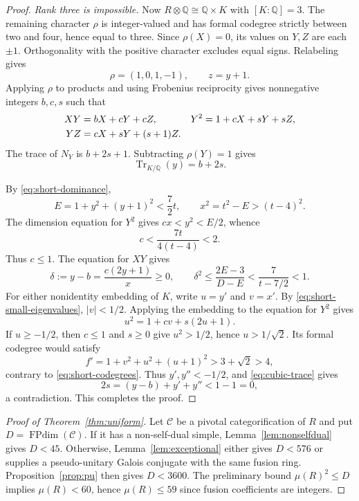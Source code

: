 \documentclass[11pt]{amsart}
\theoremstyle{definition}
\DeclareMathOperator{\FPdim}{FPdim}
\DeclareMathOperator{\Tr}{Tr}
\newcommand{\Q}{\mathbb Q}
\numberwithin{equation}{section}
\begin{document}
\begin{proof}
\smallskip\noindent
\emph{Rank three is impossible.}
Now $R\otimes\Q\cong\Q\times K$ with $[K:\Q]=3$. The remaining character $\rho$ is integer-valued and has formal codegree strictly between two and four, hence equal to three. Since $\rho(X)=0$, its values on $Y,Z$ are each $\pm1$. Orthogonality with the positive character excludes equal signs. Relabeling gives
\begin{equation}\label{eq:cubic-rational}
 \rho=(1,0,1,-1),\qquad z=y+1.
\end{equation}
Applying $\rho$ to products and using Frobenius reciprocity gives
nonnegative integers $b,c,s$ such that
\begin{align}
 XY&=bX+cY+cZ, &Y^2&=1+cX+sY+sZ,\label{eq:cubic-products}\\
 YZ&=cX+sY+(s+1)Z.\notag
\end{align}
The trace of $N_Y$ is $b+2s+1$. Subtracting $\rho(Y)=1$ gives
\begin{equation}\label{eq:cubic-trace}
 \Tr_{K/\Q}(y)=b+2s.
\end{equation}

By \eqref{eq:short-dominance},
\[
 E=1+y^2+(y+1)^2<\frac72t,
 \qquad x^2=t^2-E>(t-4)^2.
\]
The dimension equation for $Y^2$ gives $cx<y^2<E/2$, whence
\[
 c<\frac{7t}{4(t-4)}<2.
\]
Thus $c\leq1$. The equation for $XY$ gives
\[
 \delta:=y-b=\frac{c(2y+1)}x\geq0,\qquad
 \delta^2\leq\frac{2E-3}{D-E}<\frac7{t-7/2}<1.
\]
For either nonidentity embedding of $K$, write $u=y'$ and $v=x'$.
By \eqref{eq:short-small-eigenvalues}, $|v|<1/2$. Applying the embedding
to the equation for $Y^2$ gives
\[
 u^2=1+cv+s(2u+1).
\]
If $u\geq-1/2$, then $c\leq1$ and $s\geq0$ give $u^2>1/2$,
hence $u>1/\sqrt2$. Its formal codegree would satisfy
\[
 f'=1+v^2+u^2+(u+1)^2>3+\sqrt2>4,
\]
contrary to \eqref{eq:short-codegrees}. Thus $y',y''<-1/2$, and
\eqref{eq:cubic-trace} gives
\[
 2s=(y-b)+y'+y''<1-1=0,
\]
a contradiction. This completes the proof.
\end{proof}

\begin{proof}[Proof of Theorem~\ref{thm:uniform}]
Let $\mathcal C$ be a pivotal categorification of $R$ and put
$D=\FPdim(\mathcal C)$. If it has a non-self-dual simple,
Lemma~\ref{lem:nonselfdual} gives $D<45$. Otherwise,
Lemma~\ref{lem:exceptional} either gives $D<576$ or supplies a
pseudo-unitary Galois conjugate with the same fusion ring.
Proposition~\ref{prop:pu} then gives $D<3600$.
The preliminary bound $\mu(R)^2\leq D$ implies $\mu(R)<60$, hence
$\mu(R)\leq59$ since fusion coefficients are integers.
\end{proof}
\end{document}
